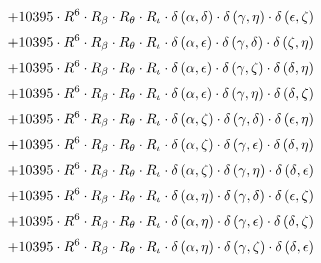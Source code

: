 \begin{subequations}
\begin{gather}
 \\[0.2em] \notag 		 + 10395 \cdot R^{6} \cdot R_{\beta{}} \cdot R_{\theta{}} \cdot R_{\iota{}} \cdot \delta{}\left(\alpha{}, \delta{}\right) \cdot \delta{}\left(\gamma{}, \eta{}\right) \cdot \delta{}\left(\epsilon{}, \zeta{}\right) 
 \\[0.2em] \notag 		 + 10395 \cdot R^{6} \cdot R_{\beta{}} \cdot R_{\theta{}} \cdot R_{\iota{}} \cdot \delta{}\left(\alpha{}, \epsilon{}\right) \cdot \delta{}\left(\gamma{}, \delta{}\right) \cdot \delta{}\left(\zeta{}, \eta{}\right) 
 \\[0.2em] \notag 		 + 10395 \cdot R^{6} \cdot R_{\beta{}} \cdot R_{\theta{}} \cdot R_{\iota{}} \cdot \delta{}\left(\alpha{}, \epsilon{}\right) \cdot \delta{}\left(\gamma{}, \zeta{}\right) \cdot \delta{}\left(\delta{}, \eta{}\right) 
 \\[0.2em] \notag 		 + 10395 \cdot R^{6} \cdot R_{\beta{}} \cdot R_{\theta{}} \cdot R_{\iota{}} \cdot \delta{}\left(\alpha{}, \epsilon{}\right) \cdot \delta{}\left(\gamma{}, \eta{}\right) \cdot \delta{}\left(\delta{}, \zeta{}\right) 
 \\[0.2em] \notag 		 + 10395 \cdot R^{6} \cdot R_{\beta{}} \cdot R_{\theta{}} \cdot R_{\iota{}} \cdot \delta{}\left(\alpha{}, \zeta{}\right) \cdot \delta{}\left(\gamma{}, \delta{}\right) \cdot \delta{}\left(\epsilon{}, \eta{}\right) 
 \\[0.2em] \notag 		 + 10395 \cdot R^{6} \cdot R_{\beta{}} \cdot R_{\theta{}} \cdot R_{\iota{}} \cdot \delta{}\left(\alpha{}, \zeta{}\right) \cdot \delta{}\left(\gamma{}, \epsilon{}\right) \cdot \delta{}\left(\delta{}, \eta{}\right) 
 \\[0.2em] \notag 		 + 10395 \cdot R^{6} \cdot R_{\beta{}} \cdot R_{\theta{}} \cdot R_{\iota{}} \cdot \delta{}\left(\alpha{}, \zeta{}\right) \cdot \delta{}\left(\gamma{}, \eta{}\right) \cdot \delta{}\left(\delta{}, \epsilon{}\right) 
 \\[0.2em] \notag 		 + 10395 \cdot R^{6} \cdot R_{\beta{}} \cdot R_{\theta{}} \cdot R_{\iota{}} \cdot \delta{}\left(\alpha{}, \eta{}\right) \cdot \delta{}\left(\gamma{}, \delta{}\right) \cdot \delta{}\left(\epsilon{}, \zeta{}\right) 
 \\[0.2em] \notag 		 + 10395 \cdot R^{6} \cdot R_{\beta{}} \cdot R_{\theta{}} \cdot R_{\iota{}} \cdot \delta{}\left(\alpha{}, \eta{}\right) \cdot \delta{}\left(\gamma{}, \epsilon{}\right) \cdot \delta{}\left(\delta{}, \zeta{}\right) 
 \\[0.2em] \notag 		 + 10395 \cdot R^{6} \cdot R_{\beta{}} \cdot R_{\theta{}} \cdot R_{\iota{}} \cdot \delta{}\left(\alpha{}, \eta{}\right) \cdot \delta{}\left(\gamma{}, \zeta{}\right) \cdot \delta{}\left(\delta{}, \epsilon{}\right) 

\end{gather}
\end{subequations}
